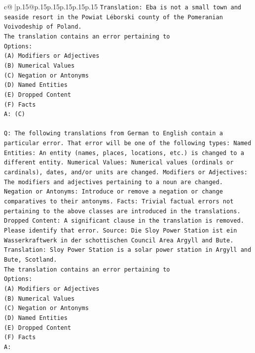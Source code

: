 \documentclass{article}
\begin{document}
{\begin{supertabular}{c@{$\;$}|p{.15\linewidth}@{}p{.15\linewidth}p{.15\linewidth}p{.15\linewidth}p{.15\linewidth}p{.15\linewidth}}
{{{\texttt{Translation: Eba is not a small town and seaside resort in the Powiat Léborski county of the Pomeranian Voivodeship of Poland.} \\
\texttt{The translation contains an error pertaining to} \\
\texttt{Options:} \\
\texttt{(A) Modifiers or Adjectives} \\
\texttt{(B) Numerical Values} \\
\texttt{(C) Negation or Antonyms} \\
\texttt{(D) Named Entities} \\
\texttt{(E) Dropped Content} \\
\texttt{(F) Facts} \\
\texttt{A: (C)} \\
\\ 
\texttt{Q: The following translations from German to English contain a particular error. That error will be one of the following types: Named Entities: An entity (names, places, locations, etc.) is changed to a different entity. Numerical Values: Numerical values (ordinals or cardinals), dates, and/or units are changed. Modifiers or Adjectives: The modifiers and adjectives pertaining to a noun are changed. Negation or Antonyms: Introduce or remove a negation or change comparatives to their antonyms. Facts: Trivial factual errors not pertaining to the above classes are introduced in the translations. Dropped Content: A significant clause in the translation is removed. Please identify that error.  Source: Die Sloy Power Station ist ein Wasserkraftwerk in der schottischen Council Area Argyll and Bute.} \\
\texttt{Translation: Sloy Power Station is a solar power station in Argyll and Bute, Scotland.} \\
\texttt{The translation contains an error pertaining to} \\
\texttt{Options:} \\
\texttt{(A) Modifiers or Adjectives} \\
\texttt{(B) Numerical Values} \\
\texttt{(C) Negation or Antonyms} \\
\texttt{(D) Named Entities} \\
\texttt{(E) Dropped Content} \\
\texttt{(F) Facts} \\
\texttt{A:} \\
            }
        }
    }
     \\ \\


\end{supertabular}}
\end{document}
